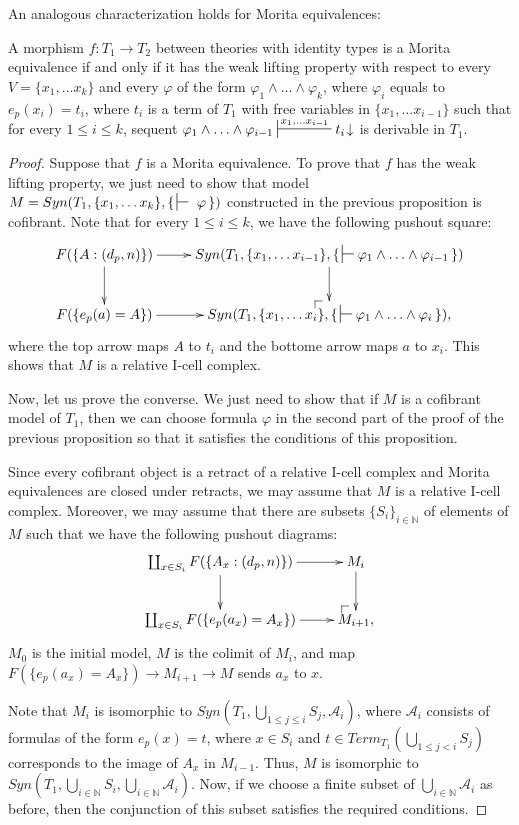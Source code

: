 \documentclass[reqno]{amsart}
\makeatletter
\theoremstyle{definition}
\theoremstyle{remark}
\newcommand{\I}{\mathrm{I}}
\numberwithin{figure}{section}
\newcommand{\po}[1][dr]{\save*!/#1+1.2pc/#1:(1,-1)@^{|-}\restore}
\makeatother
\begin{document}
An analogous characterization holds for Morita equivalences:

\begin{prop}
A morphism $f : T_1 \to T_2$ between theories with identity types is a Morita equivalence if and only if 
it has the weak lifting property with respect to every $V = \{ x_1, \ldots x_k \}$
and every $\varphi$ of the form $\varphi_1 \land \ldots \land \varphi_k$, where $\varphi_i$ equals to $e_p(x_i) = t_i$,
where $t_i$ is a term of $T_1$ with free variables in $\{ x_1, \ldots x_{i-1} \}$ such that for every $1 \leq i \leq k$,
sequent $\varphi_1 \land \ldots \land \varphi_{i-1} \sststile{}{x_1, \ldots x_{i-1}} t_i\!\downarrow$ is derivable in $T_1$.
\end{prop}
\begin{proof}
Suppose that $f$ is a Morita equivalence.
To prove that $f$ has the weak lifting property, we just need to show that model $M = Syn(T_1, \{ x_1, \ldots x_k \}, \{\,\sststile{}{}~\varphi\,\})$
constructed in the previous proposition is cofibrant.
Note that for every $1 \leq i \leq k$, we have the following pushout square:
\[ \xymatrix{ F(\{ A : (d_p,n) \}) \ar[d] \ar[r] &     Syn(T_1, \{ x_1, \ldots x_{i-1} \}, \{\,\sststile{}{} \varphi_1 \land \ldots \land \varphi_{i-1} \,\}) \ar[d] \\
              F(\{ e_p(a) = A \})         \ar[r] & \po Syn(T_1, \{ x_1, \ldots x_i \}, \{\,\sststile{}{} \varphi_1 \land \ldots \land \varphi_i \,\}),
            } \]
where the top arrow maps $A$ to $t_i$ and the bottome arrow maps $a$ to $x_i$.
This shows that $M$ is a relative $\I$-cell complex.

Now, let us prove the converse.
We just need to show that if $M$ is a cofibrant model of $T_1$, then we can choose formula $\varphi$
in the second part of the proof of the previous proposition so that it satisfies the conditions of this proposition.

Since every cofibrant object is a retract of a relative $\I$-cell complex and Morita equivalences are closed under retracts, we may assume that $M$ is a relative $\I$-cell complex.
Moreover, we may assume that there are subsets $\{S_i\}_{i \in \mathbb{N}}$ of elements of $M$ such that we have the following pushout diagrams:
\[ \xymatrix{ \coprod_{x \in S_i} F(\{ A_x : (d_p,n) \}) \ar[d] \ar[r] &     M_i \ar[d] \\
              \coprod_{x \in S_i} F(\{ e_p(a_x) = A_x \})       \ar[r] & \po M_{i+1},
            } \]
$M_0$ is the initial model, $M$ is the colimit of $M_i$, and map $F(\{ e_p(a_x) = A_x \}) \to M_{i+1} \to M$ sends $a_x$ to $x$.

Note that $M_i$ is isomorphic to $Syn(T_1, \bigcup_{1 \leq j \leq i} S_j, \mathcal{A}_i)$,
where $\mathcal{A}_i$ consists of formulas of the form $e_p(x) = t$, where $x \in S_i$ and $t \in Term_{T_1}(\bigcup_{1 \leq j < i} S_j)$ corresponds to the image of $A_x$ in $M_{i-1}$.
Thus, $M$ is isomorphic to $Syn(T_1, \bigcup_{i \in \mathbb{N}} S_i, \bigcup_{i \in \mathbb{N}} \mathcal{A}_i)$.
Now, if we choose a finite subset of $\bigcup_{i \in \mathbb{N}} \mathcal{A}_i$ as before, then the conjunction of this subset satisfies the required conditions.
\end{proof}
\end{document}
